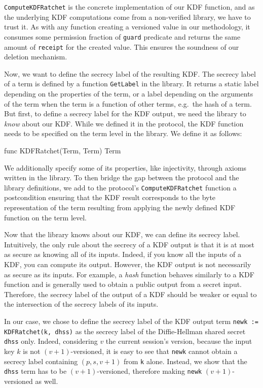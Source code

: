 \texttt{ComputeKDFRatchet} is the concrete implementation of our KDF function, and as the underlying KDF computations come from a non-verified library, we have to trust it.
As with any function creating a versioned value in our methodology, it consumes some permission fraction of \texttt{guard} predicate and returns the same amount of \texttt{receipt} for the created value. This ensures the soundness of our deletion mechanism.

Now, we want to define the secrecy label of the resulting KDF.
The secrecy label of a term is defined by a function \texttt{GetLabel} in the library. It returns a static label depending on the properties of the term, or a label depending on the arguments of the term when the term is a function of other terms, e.g.\  the hash of a term.
But first, to define a secrecy label for the KDF output, we need the library to \emph{know} about our KDF. While we defined it in the protocol, the KDF function needs to be specified on the term level in the library. We define it as follows:
\begin{gobra}
func KDFRatchet(Term, Term) Term
\end{gobra}
We additionally specify some of its properties, like injectivity, through axioms written in the library.
To then bridge the gap between the protocol and the library definitions, we add to the protocol's \texttt{ComputeKDFRatchet} function a postcondition ensuring that the KDF result corresponds to the byte representation of the term resulting from applying the newly defined KDF function on the term level.

Now that the library knows about our KDF, we can define its secrecy label.
Intuitively, the only rule about the secrecy of a KDF output is that it is at most as secure as knowing all of its inputs. Indeed, if you know all the inputs of a KDF, you can compute its output.
However, the KDF output is not necessarily as secure as its inputs. For example, a \emph{hash} function behaves similarly to a KDF function and is generally used to obtain a public output from a secret input. 
Therefore, the secrecy label of the output of a KDF should be weaker or equal to the intersection of the secrecy labels of its inputs.

In our case, we chose to define the secrecy label of the KDF output term \texttt{newk~:= KDFRatchet(k, dhss)} as the secrecy label of the Diffie-Hellman shared secret \texttt{dhss} only.
Indeed, considering $v$ the current session's version, because the input key $k$ is not $(v+1)$-versioned, it is easy to see that \texttt{newk} cannot obtain a secrecy label containing $(p,s,v+1)$ from \texttt{k} alone.
Instead, we show that the \texttt{dhss} term has to be $(v+1)$-versioned, therefore making \texttt{newk} $(v+1)$-versioned as well.

